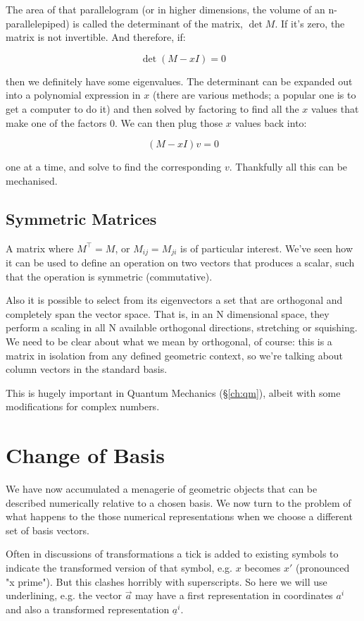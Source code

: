 The area of that parallelogram (or in higher dimensions, the volume of an n-parallelepiped) is called the determinant of the matrix, $\det M$. If it's zero, the matrix is not invertible. And therefore, if:

$$\det{(M - xI)} = 0$$

then we definitely have some eigenvalues. The determinant can be expanded out into a polynomial expression in $x$ (there are various methods; a popular one is to get a computer to do it) and then solved by factoring to find all the $x$ values that make one of the factors $0$. We can then plug those $x$ values back into:

$$(M - xI)v = 0$$

one at a time, and solve to find the corresponding $v$. Thankfully all this can be mechanised.

\subsection{Symmetric Matrices}\label{ch:vectors-symmetric}

A matrix where $M^\intercal = M$, or $M_{ij} = M_{ji}$ is of particular interest. We've seen how it can be used to define an operation on two vectors that produces a scalar, such that the operation is symmetric (commutative).

Also it is possible to select from its eigenvectors a set that are orthogonal and completely span the vector space. That is, in an N dimensional space, they perform a scaling in all N available orthogonal directions, stretching or squishing. We need to be clear about what we mean by orthogonal, of course: this is a matrix in isolation from any defined geometric context, so we're talking about column vectors in the standard basis.

This is hugely important in Quantum Mechanics (§\ref{ch:qm}), albeit with some modifications for complex numbers.

\section{Change of Basis}\label{sec:vectors-change-basis}

We have now accumulated a menagerie of geometric objects that can be described numerically relative to a chosen basis. We now turn to the problem of what happens to the those numerical representations when we choose a different set of basis vectors.

Often in discussions of transformations a tick is added to existing symbols to indicate the transformed version of that symbol, e.g. $x$ becomes $x'$ (pronounced "x prime"). But this clashes horribly with superscripts. So here we will use underlining, e.g. the vector $\vec{a}$ may have a first representation in coordinates $a^i$ and also a transformed representation $\underline{a}^i$.

